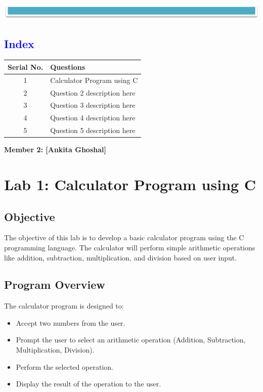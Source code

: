 \documentclass{article}
\begin{document}
\begin{center}
    \includegraphics[width=1\textwidth]{Line.png}
\end{center}
\newpage
\newpage
\begin{center}
    \section*{\textcolor{blue}{\textbf{Index}}}
\end{center}

\begin{table}[h!]
\centering
\begin{tabular}{|c|p{10cm}|}
    \hline
    \textbf{Serial No.} & \textbf{Questions} \\ \hline
    1 & Calculator Program using C \\ \hline
    2 & Question 2 description here \\ \hline
    3 & Question 3 description here \\ \hline
    4 & Question 4 description here \\ \hline
    5 & Question 5 description here \\ \hline
\end{tabular}
\end{table}


\newpage
\begin{center}
    \textbf{\LARGE{{Member 2: [Ankita Ghoshal]}}}
\end{center}
\section{Lab 1: Calculator Program using C}
\subsection{Objective}
The objective of this lab is to develop a basic calculator program using the C programming language. The calculator will perform simple arithmetic operations like addition, subtraction, multiplication, and division based on user input.

\subsection{Program Overview}
The calculator program is designed to:
\begin{itemize}
    \item Accept two numbers from the user.
    \item Prompt the user to select an arithmetic operation (Addition, Subtraction, Multiplication, Division).
    \item Perform the selected operation.
    \item Display the result of the operation to the user.
\end{itemize}
\end{document}
